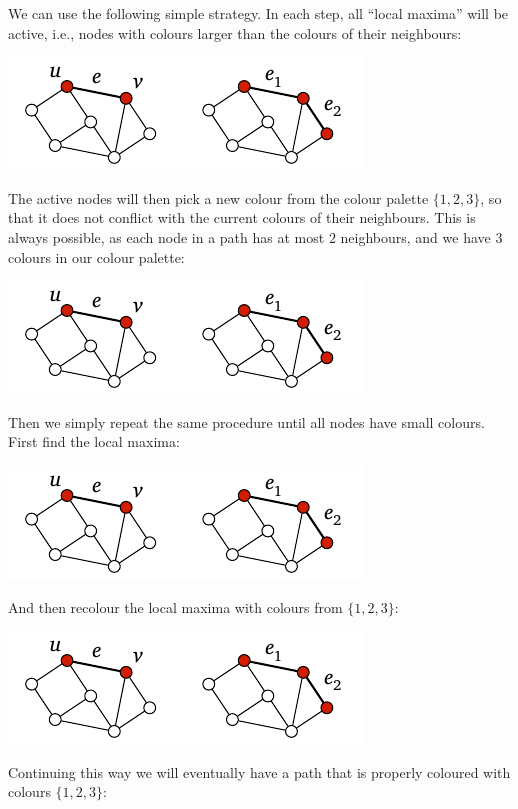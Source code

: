 We can use the following simple strategy. In each step, all ``local maxima'' will be active, i.e., nodes with colours larger than the colours of their neighbours:
\begin{center}
    \includegraphics[page=\PIntroIdA]{figs.pdf}
\end{center}
The active nodes will then pick a new colour from the colour palette $\{1,2,3\}$, so that it does not conflict with the current colours of their neighbours. This is always possible, as each node in a path has at most $2$ neighbours, and we have $3$ colours in our colour palette:
\begin{center}
    \includegraphics[page=\PIntroIdAA]{figs.pdf}
\end{center}
Then we simply repeat the same procedure until all nodes have small colours. First find the local maxima:
\begin{center}
    \includegraphics[page=\PIntroIdB]{figs.pdf}
\end{center}
And then recolour the local maxima with colours from $\{1,2,3\}$:
\begin{center}
    \includegraphics[page=\PIntroIdBB]{figs.pdf}
\end{center}
Continuing this way we will eventually have a path that is properly coloured with colours $\{1,2,3\}$:
